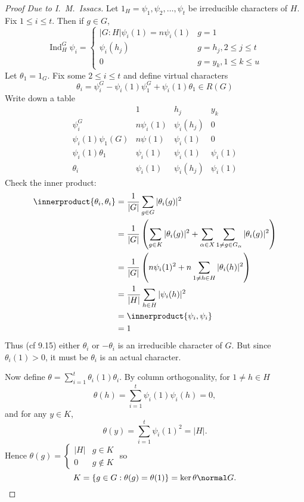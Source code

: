 \documentclass[a4paper]{article}
\newcommand*{\ip}{\innerproduct} %
\DeclareMathOperator{\Ind}{Ind} %
\theoremstyle{definition}
\begin{document}
\begin{proof}[Proof Due to I.\ M.\ Issacs]
  Let \(1_H = \psi_1, \psi_2, \dots, \psi_t\) be irreducible characters of \(H\). Fix \(1 \leq i \leq t\). Then if \(g \in G\),
  \[
    \Ind_H^G \psi_i =
    \begin{cases}
      |G: H| \psi_i(1) = n \psi_i(1) & g = 1 \\
      \psi_i(h_j) & g = h_j, 2 \leq j \leq t \\
      0 & g = y_k, 1 \leq k \leq u
    \end{cases}
  \]
  Let \(\theta_1 = 1_G\). Fix some \(2 \leq i \leq t\) and define virtual characters
  \[
    \theta_i = \psi_i^G - \psi_i(1) \psi_1^G + \psi_i(1) \theta_1 \in R(G)
  \]
  Write down a table
  \[
    \begin{array}{r|cccc}
      & 1 & h_j & y_k \\ \hline
      \psi_i^G & n \psi_i(1) & \psi_i(h_j) & 0 \\
      \psi_i(1) \psi_1(G) & n\psi(1) & \psi_i(1) & 0 \\
      \psi_i(1) \theta_1 & \psi_i(1) & \psi_i(1) & \psi_i(1) \\ \hline
      \theta_i & \psi_i(1) & \psi_i(h_j) & \psi_i(1)
    \end{array}
  \]
  Check the inner product:
  \begin{align*}
    \ip{\theta_i, \theta_i}
    &= \frac{1}{|G|} \sum_{g \in G} |\theta_i(g)|^2 \\
    &= \frac{1}{|G|} \left( \sum_{g \in K} |\theta_i(g)|^2 + \sum_{\alpha \in X} \sum_{1 \neq g \in G_\alpha} |\theta_i(g)|^2 \right) \\
    &= \frac{1}{|G|} \left( n \psi_i(1)^2 + n \sum_{1 \neq h \in H} |\theta_i(h)|^2 \right) \\
    &= \frac{1}{|H|} \sum_{h \in H} |\psi_i(h)|^2 \\
    &= \ip{\psi_i, \psi_i} \\
    &= 1
  \end{align*}
  Thus (cf 9.15) either \(\theta_i\) or \(-\theta_i\) is an irreducible character of \(G\). But since \(\theta_i(1) > 0\), it must be \(\theta_i\) is an actual character.

  Now define \(\theta = \sum_{i = 1}^t \theta_i(1) \theta_i\). By column orthogonality, for \(1 \neq h \in H\)
  \[
    \theta(h) = \sum_{i = 1}^t \psi_i(1) \psi_i(h) = 0,
  \]
  and for any \(y \in K\),
  \[
    \theta(y) = \sum_{i = 1}^t \psi_i(1)^2 = |H|.
  \]
  Hence \(\theta(g) =
  \begin{cases}
    |H| & g \in K \\
    0 & g \notin K
  \end{cases}
  \) so
  \[
    K = \{g \in G: \theta(g) = \theta(1)\} = \ker \theta \normal G.
  \]
\end{proof}
\end{document}
